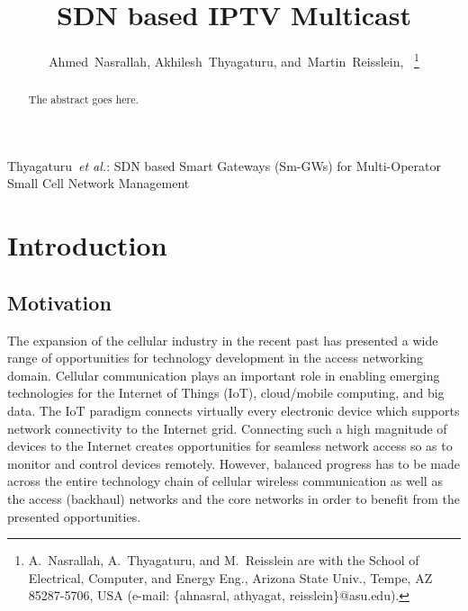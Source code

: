 \documentclass[journal,twoside,comsoc]{IEEEtran}
\begin{document}
\title{SDN based IPTV Multicast}

\author{Ahmed~Nasrallah, Akhilesh~Thyagaturu,
        and~Martin~Reisslein,~%
\thanks{A.~Nasrallah, A.~Thyagaturu, and M.~Reisslein are with the School of Electrical,
	Computer, and  Energy Eng., Arizona State Univ., Tempe, AZ 85287-5706, USA
	(e-mail: \{ahnasral, athyagat, reisslein\}@asu.edu).}}%

 {Thyagaturu~\MakeLowercase{\textit{et al.}}: 
	 SDN based Smart Gateways (Sm-GWs) for Multi-Operator Small Cell Network Management}

\maketitle

\begin{abstract}
The abstract goes here.
\end{abstract}

\section{Introduction} 

\subsection{Motivation}
The expansion of the cellular industry in the recent past has presented a wide
range of opportunities for technology development in the access networking domain.
Cellular communication plays an important role in enabling
emerging technologies for the Internet of Things (IoT),
cloud/mobile computing, and big data.
The IoT paradigm connects virtually every electronic device which
supports network connectivity to the Internet grid.
Connecting such a high magnitude of devices to the Internet
creates opportunities for seamless network access so as to monitor and control
devices remotely.
However, balanced progress has to be made across the
entire technology chain of cellular wireless communication as
well as the access (backhaul) networks and
the core networks in order to benefit from the presented opportunities.
\end{document}
